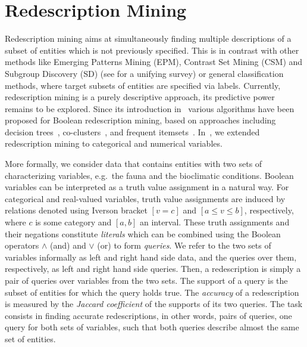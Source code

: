 \section{Redescription Mining}
\label{sec:redescription-mining}

Redescription mining aims at simultaneously finding multiple
descriptions of a subset of entities which is not previously
specified.  This is in contrast with other methods like Emerging
Patterns Mining (EPM), Contrast Set Mining (CSM) and Subgroup
Discovery (SD) (see \cite{kralj09supervised} for a unifying survey) or
general classification methods, where target subsets of entities are
specified via labels.  Currently, redescription mining is a purely
descriptive approach, its predictive power remains to be explored.
Since its introduction in~\cite{ramakrishnan04turning} various
algorithms have been proposed for Boolean redescription mining, based
on approaches including decision
trees~\cite{ramakrishnan04turning,kumar07redescription},
co-clusters~\cite{parida05redescription}, and frequent
itemsets~\cite{gallo08finding}. In~\cite{galbrun11black}, we extended
redescription mining to categorical and numerical variables.

More formally, we consider data that contains entities with two sets
of characterizing variables, e.g.\ the fauna and the bioclimatic
conditions. 
Boolean variables can be interpreted as a truth value
assignment in a natural way.  For categorical and real-valued
variables, truth value assignments are induced by relations denoted using Iverson bracket $[v=c]$
and $[a \leq v \leq b]$, respectively, where $c$ is some category and
$[a, b]$ an interval.  These truth assignments and their negations
constitute \emph{literals} which can be combined using the Boolean
operators $\land$ (and) and $\lor$ (or) to form \emph{queries}.
We refer to the two sets of variables informally as left and right
hand side data, and the queries over them, respectively, as left and
right hand side queries.
Then, a redescription is simply a pair of queries over variables from the
two sets.  The support of a query is the subset of entities for which
the query holds true.  The \emph{accuracy} of a redescription is
measured by the \emph{Jaccard coefficient} of the supports of its two
queries.
The task consists in finding accurate redescriptions, in other words, pairs of
queries, one query for both sets of variables, such that both queries
describe almost the same set of entities.

